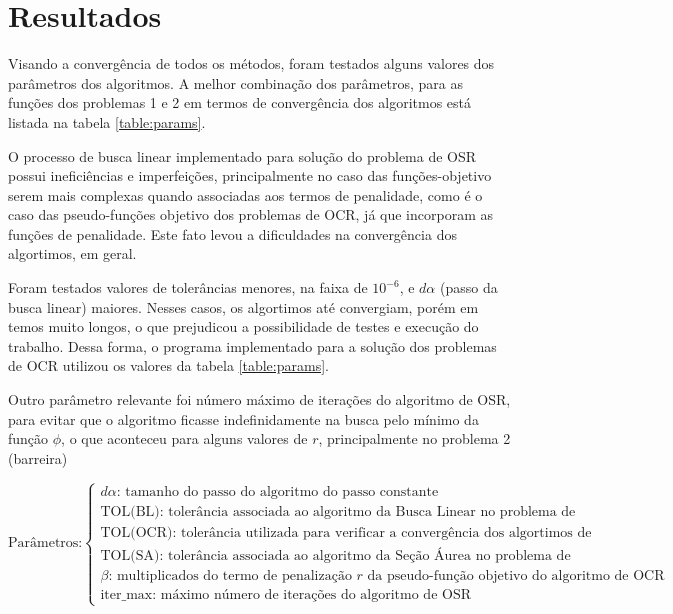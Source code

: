 \documentclass[10pt, a4paper]{article}
\begin{document}
\section{Resultados}

Visando a converg\^encia de todos os m\'etodos, foram testados alguns valores dos par\^ametros dos algoritmos. A melhor combina\c c\~ao dos par\^ametros, para as fun\c c\~oes dos problemas 1 e 2 em termos de converg\^encia dos algoritmos est\'a listada na tabela \ref{table:params}.

O processo de busca linear implementado para solu\c c\~ao do problema de OSR possui inefici\^encias e imperfei\c c\~oes, principalmente no caso das fun\c c\~oes-objetivo serem mais complexas quando associadas aos termos de penalidade, como  \'e o caso das pseudo-fun\c c\~oes objetivo dos problemas de OCR, j\'a que incorporam as fun\c c\~oes de penalidade. Este fato levou a dificuldades na converg\^encia dos algortimos, em geral.

Foram testados valores de toler\^ancias menores, na faixa de $10^{-6}$, e $d\alpha$ (passo da busca linear) maiores. Nesses casos, os algortimos at\'e convergiam, por\'em em temos muito longos, o que prejudicou a possibilidade de testes e execu\c c\~ao do trabalho. Dessa forma, o programa implementado para a solu\c c\~ao dos problemas de OCR utilizou os valores da tabela \ref{table:params}.

Outro par\^ametro relevante foi n\'umero m\'aximo de itera\c c\~oes do algoritmo de OSR, para evitar que o algoritmo ficasse indefinidamente na busca pelo m\'inimo da fun\c c\~ao $\phi$, o que aconteceu para alguns valores de $r$, principalmente no problema 2 (barreira)

\small
$$
\text{Par\^ametros:} \begin{cases}
      \text{$d\alpha$:  tamanho do passo do algoritmo do passo constante}\\
      \text{TOL(BL):    toler\^ancia associada ao algoritmo da Busca Linear no problema de OSR}\\
      \text{TOL(OCR):   toler\^ancia utilizada para verificar a converg\^encia dos algortimos de OCR}\\
      \text{TOL(SA):    toler\^ancia associada ao algoritmo da Se\c c\~ao \'Aurea no problema de OSR}\\
      \text{$\beta$:    multiplicados do termo de penaliza\c c\~ao $r$ da pseudo-fun\c c\~ao objetivo do algoritmo de OCR}\\
      \text{iter\_max:  m\'aximo n\'umero de itera\c c\~oes do algoritmo de OSR}
\end{cases}
$$
\normalsize
\end{document}

